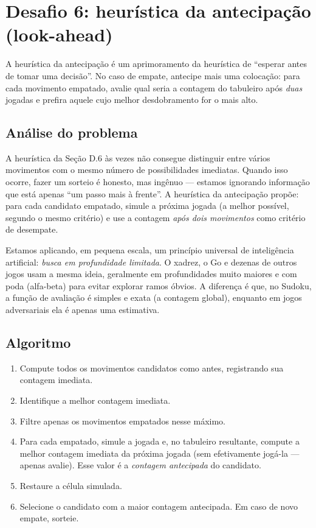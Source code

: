 \documentclass[11pt,a4paper,oneside]{report}
\begin{document}
\section{Desafio 6: heurística da antecipação (look-ahead)}

\begin{enunciado}
A heurística da antecipação é um aprimoramento da heurística de
``esperar antes de tomar uma decisão''. No caso de empate, antecipe
mais uma colocação: para cada movimento empatado, avalie qual seria
a contagem do tabuleiro após \emph{duas} jogadas e prefira aquele cujo
melhor desdobramento for o mais alto.
\end{enunciado}

\subsection{Análise do problema}

A heurística da Seção D.6 às vezes não consegue distinguir entre vários
movimentos com o mesmo número de possibilidades imediatas. Quando isso
ocorre, fazer um sorteio é honesto, mas ingênuo --- estamos ignorando
informação que está apenas ``um passo mais à frente''. A heurística da
antecipação propõe: para cada candidato empatado, simule a próxima
jogada (a melhor possível, segundo o mesmo critério) e use a contagem
\emph{após dois movimentos} como critério de desempate.

\begin{engenharia}
Estamos aplicando, em pequena escala, um princípio universal de
inteligência artificial: \emph{busca em profundidade limitada}. O xadrez,
o Go e dezenas de outros jogos usam a mesma ideia, geralmente em
profundidades muito maiores e com poda (alfa-beta) para evitar explorar
ramos óbvios. A diferença é que, no Sudoku, a função de avaliação é
simples e exata (a contagem global), enquanto em jogos adversariais ela
é apenas uma estimativa.
\end{engenharia}

\subsection{Algoritmo}

\begin{enumerate}
    \item Compute todos os movimentos candidatos como antes, registrando
        sua contagem imediata.
    \item Identifique a melhor contagem imediata.
    \item Filtre apenas os movimentos empatados nesse máximo.
    \item Para cada empatado, simule a jogada e, no tabuleiro resultante,
        compute a melhor contagem imediata da próxima jogada (sem
        efetivamente jogá-la --- apenas avalie). Esse valor é a
        \emph{contagem antecipada} do candidato.
    \item Restaure a célula simulada.
    \item Selecione o candidato com a maior contagem antecipada. Em caso
        de novo empate, sorteie.
\end{enumerate}
\end{document}
